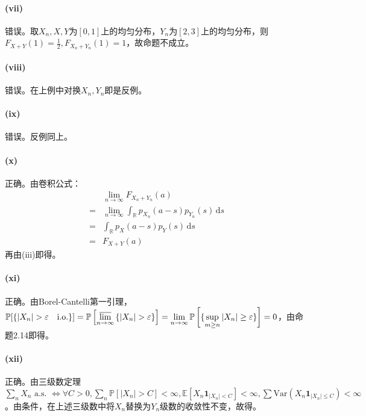\documentclass{ctexart}
\begin{document}
\paragraph{(vii)}
错误。取$X_n,X,Y$为$[0,1]$上的均匀分布，$Y_n$为$[2,3]$上的均匀分布，则$F_{X+Y}(1)=\frac{1}{2}, F_{X_n+Y_n}(1)=1$，故命题不成立。

\paragraph{(viii)}

错误。在上例中对换$X_n,Y_n$即是反例。
\paragraph{(ix)}
错误。反例同上。

\paragraph{(x)}
正确。由卷积公式：
\begin{align*}
  &\lim\limits_{n\to\infty}F_{X_n+Y_n}(a)\\
  =&\lim\limits_{n\to\infty}\int_{\mathbb{R}}^{} p_{X_n}(a-s)p_{Y_n}(s) \,\mathrm{d}s\\
  =&\int_{\mathbb{R}}^{} p_X(a-s)p_Y(s) \,\mathrm{d}s\\
  =&F_{X+Y}(a)
\end{align*}
再由(iii)即得。

\paragraph{(xi)}
正确。由Borel-Cantelli第一引理，$\mathbb{P}[\left\{ |X_n|>\varepsilon \quad \mathrm{i.o.}\right\} ]=\mathbb{P}\left[\varlimsup\limits_{n\to\infty} \left\{ |X_{n}|>\varepsilon \right\} \right]=\lim\limits_{n\to\infty}\mathbb{P}\left[\{ \sup\limits_{m\geq n}|X_n| \geq \varepsilon\}\right]=0$，由命题2.14即得。

\paragraph{(xii)}
正确。由三级数定理$\sum\limits_{n}^{}X_n \text{ a.s. }\Leftrightarrow\forall C>0, \sum\limits_{n}^{}\mathbb{P}\left[ |X_n|>C\right]<\infty, \underset{}{\mathbb{E}}\left[ X_{n}\mathbf{1}_{|X_n|<C}\right]<\infty, \sum \mathrm{Var}(X_{n}\mathbf{1}_{|X_n|\leq C})<\infty $。由条件，在上述三级数中将$X_n$替换为$Y_n$级数的收敛性不变，故得。
\end{document}
